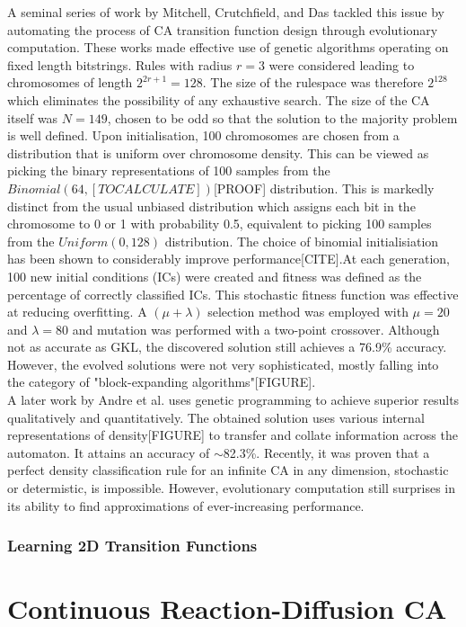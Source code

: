 A seminal series of work by Mitchell, Crutchfield, and Das\cite{mitchell1996evolving} tackled this issue by automating the process of CA transition function design through evolutionary computation. These works made effective use of genetic algorithms operating on fixed length bitstrings. Rules with radius $r = 3$ were considered leading to chromosomes of length $2^{2r+1}=128$. The size of the rulespace was therefore $2^{128}$ which eliminates the possibility of any exhaustive search. The size of the CA itself was $N=149$, chosen to be odd so that the solution to the majority problem is well defined. Upon initialisation, 100 chromosomes are chosen from a distribution that is uniform over chromosome density. This can be viewed as picking the binary representations of 100 samples from the $Binomial(64, [TO CALCULATE])$[PROOF] distribution. This is markedly distinct from the usual unbiased distribution which assigns each bit in the chromosome to 0 or 1 with probability 0.5, equivalent to picking 100 samples from the $Uniform(0, 128)$ distribution. The choice of binomial initialisiation has been shown to considerably improve performance[CITE].At each generation, 100 new initial conditions (ICs) were created and fitness was defined as the percentage of correctly classified ICs. This stochastic fitness function was effective at reducing overfitting. A $(\mu+\lambda)$ selection method was employed with $\mu=20$ and $\lambda=80$ and mutation was performed with a two-point crossover. Although not as accurate as GKL, the discovered solution still achieves a 76.9\% accuracy. However, the evolved solutions were not very sophisticated, mostly falling into the category of "block-expanding algorithms"[FIGURE].\\

A later work by Andre et al.\cite{andre1996discovery} uses genetic programming to achieve superior results qualitatively and quantitatively. The obtained solution uses various internal representations of density[FIGURE] to transfer and collate information across the automaton. It attains an accuracy of $\sim$82.3\%. Recently, it was proven that a perfect density classification rule for an infinite CA in any dimension, stochastic or determistic, is impossible\cite{buvsic2012density}. However, evolutionary computation still surprises in its ability to find approximations of ever-increasing performance. 

\subsubsection{Learning 2D Transition Functions}

\section{Continuous Reaction-Diffusion CA}